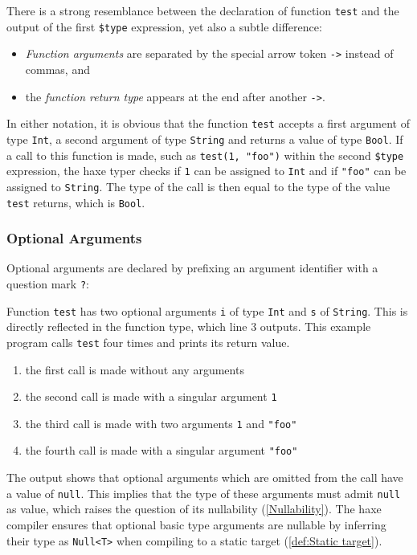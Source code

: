 \documentclass{article}
\newcommand{\type}[1]{\texttt{#1}}
\newcommand{\expr}[1]{\texttt{#1}}
\newcommand{\tref}[2]{#1 (\ref{#2})}
\newcommand{\haxe}[2][]{%
}
\begin{document}
There is a strong resemblance between the declaration of function \expr{test} and the output of the first \expr{\$type} expression, yet also a subtle difference:

\begin{itemize}
	\item \emph{Function arguments} are separated by the special arrow token \expr{->} instead of commas, and
	\item the \emph{function return type} appears at the end after another \expr{->}.
\end{itemize}
In either notation, it is obvious that the function \expr{test} accepts a first argument of type \type{Int}, a second argument of type \type{String} and returns a value of type \type{Bool}. If a call to this function is made, such as \expr{test(1, "foo")} within the second \expr{\$type} expression, the haxe typer checks if \expr{1} can be assigned to \type{Int} and if \expr{"foo"} can be assigned to \type{String}. The type of the call is then equal to the type of the value \expr{test} returns, which is \type{Bool}.


\subsubsection{Optional Arguments}
\label{Optional Arguments}

Optional arguments are declared by prefixing an argument identifier with a question mark \expr{?}:

\haxe[label=assets/OptionalArguments.hx]{assets/OptionalArguments.hx}
Function \expr{test} has two optional arguments \expr{i} of type \type{Int} and \expr{s} of \type{String}. This is directly reflected in the function type, which line 3 outputs. 
This example program calls \expr{test} four times and prints its return value.

\begin{enumerate}
	\item the first call is made without any arguments
	\item the second call is made with a singular argument \expr{1}
	\item the third call is made with two arguments \expr{1} and \expr{"foo"}
	\item the fourth call is made with a singular argument \expr{"foo"}
\end{enumerate}
The output shows that optional arguments which are omitted from the call have a value of \expr{null}. This implies that the type of these arguments must admit \expr{null} as value, which raises the question of its \tref{nullability}{Nullability}. The haxe compiler ensures that optional basic type arguments are nullable by inferring their type as \type{Null<T>} when compiling to a \tref{static target}{def:Static target}.
\end{document}
